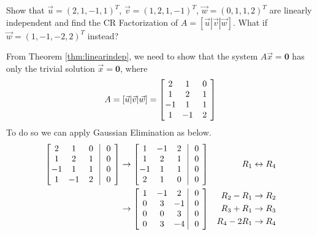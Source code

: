\begin{exmp}
Show that $\vec{u} = (2,1,-1,1)^T$, $\vec{v} = (1,2,1,-1)^T$, $\vec{w} = (0,1,1,2)^T$ are linearly independent and find the CR Factorization of $A=[\vec{u}|\vec{v}|\vec{w}]$. What if $\vec{w} = (1,-1,-2,2)^T$ instead?
\end{exmp}
\begin{solution}
From Theorem \ref{thm:linearindep}, we need to show that the system $A\vec{x} = \textbf{0}$ has only the trivial solution $\vec{x} = \textbf{0}$, where
\begin{align*}
A = [\vec{u}|\vec{v}|\vec{w}] =
\left[
\begin{array}{@{\,}wc{10pt}wc{10pt}wc{10pt}@{\,}}
2 & 1 & 0 \\
1 & 2 & 1 \\
-1 & 1 & 1 \\
1 & -1 & 2
\end{array}
\right]
\end{align*}
To do so we can apply Gaussian Elimination as below.
\begin{align*}
\left[
\begin{array}{@{\,}wc{10pt}wc{10pt}wc{10pt}|wc{10pt}@{\,}}
2 & 1 & 0 & 0\\
1 & 2 & 1 & 0\\
-1 & 1 & 1 & 0\\
1 & -1 & 2 & 0
\end{array}
\right]
&\to
\left[
\begin{array}{@{\,}wc{10pt}wc{10pt}wc{10pt}|wc{10pt}@{\,}}
1 & -1 & 2 & 0 \\
1 & 2 & 1 & 0\\
-1 & 1 & 1 & 0\\
2 & 1 & 0 & 0\\
\end{array}
\right] & R_1 \leftrightarrow R_4 \\
&\to
\left[
\begin{array}{@{\,}wc{10pt}wc{10pt}wc{10pt}|wc{10pt}@{\,}}
1 & -1 & 2 & 0 \\
0 & 3 & -1 & 0\\
0 & 0 & 3 & 0\\
0 & 3 & -4 & 0\\
\end{array}
\right] & 
\begin{aligned}
R_2 - R_1 &\to R_2 \\
R_3 + R_1 &\to R_3 \\
R_4 - 2R_1 &\to R_4 
\end{aligned}\\

\end{align*}
\end{solution}
